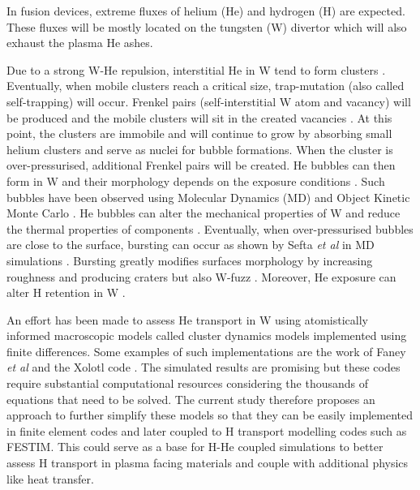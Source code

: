 In fusion devices, extreme fluxes of helium (He) and hydrogen (H) are expected.
These fluxes will be mostly located on the tungsten (W) divertor which will also exhaust the plasma He ashes.

Due to a strong W-He repulsion, interstitial He in W tend to form clusters \cite{becquart_density_2009, becquart_migration_2006}.
Eventually, when mobile clusters reach a critical size, trap-mutation (also called self-trapping) will occur.
Frenkel pairs (self-interstitial W atom and vacancy) will be produced and the mobile clusters will sit in the created vacancies .
At this point, the clusters are immobile and will continue to grow by absorbing small helium clusters and serve as nuclei for bubble formations.
When the cluster is over-pressurised, additional Frenkel pairs will be created.
He bubbles can then form in W and their morphology depends on the exposure conditions \cite{taylor_investigating_2019, qin_helium_2019, lemahieu_h/he_2016}.
Such bubbles have been observed using Molecular Dynamics (MD)  \cite{hammond_helium_2019, hamid_molecular_2019, bergstrom_molecular_2017, maroudas_helium_2016, sefta_surface_2013} and Object Kinetic Monte Carlo .
He bubbles can alter the mechanical properties of W \cite{das_hardening_2019, nguyen_modeling_2019} and reduce the thermal properties of components .
Eventually, when over-pressurised bubbles are close to the surface, bursting can occur as shown by Sefta \textit{et al} in MD simulations .
Bursting greatly modifies surfaces morphology by increasing roughness and producing craters  but also W-fuzz \cite{ de_temmerman_effect_2015, mccarthy_enhanced_2020, khan_helium_2020, bernard_temperature_2017}.
Moreover, He exposure can alter H retention in W \cite{ialovega_hydrogen_2020, markelj_hydrogen_2017, ogorodnikova_deuterium_2011, baldwin_effect_2011, miyamoto_microscopic_2011, ueda_simultaneous_2009}.

An effort has been made to assess He transport in W using atomistically informed macroscopic models called cluster dynamics models implemented using finite differences.
Some examples of such implementations are the work of Faney \textit{et al}  and the Xolotl code .
The simulated results are promising but these codes require substantial computational resources considering the thousands of equations that need to be solved.
The current study therefore proposes an approach to further simplify these models so that they can be easily implemented in finite element codes and later coupled to H transport modelling codes such as FESTIM.
This could serve as a base for H-He coupled simulations to better assess H transport in plasma facing materials and couple with additional physics like heat transfer.

